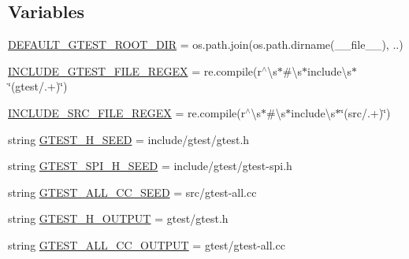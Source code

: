 \subsection*{Variables}
\begin{DoxyCompactItemize}
\item 
\mbox{\hyperlink{namespacefuse__gtest__files_a68085bdb2912baa7e71d2b3eb37b05c9}{D\+E\+F\+A\+U\+L\+T\+\_\+\+G\+T\+E\+S\+T\+\_\+\+R\+O\+O\+T\+\_\+\+D\+IR}} = os.\+path.\+join(os.\+path.\+dirname(\+\_\+\+\_\+file\+\_\+\+\_\+), \textquotesingle{}..\textquotesingle{})
\item 
\mbox{\hyperlink{namespacefuse__gtest__files_ad7abe9bfa06bb1c5411e8b4a7a686e5b}{I\+N\+C\+L\+U\+D\+E\+\_\+\+G\+T\+E\+S\+T\+\_\+\+F\+I\+L\+E\+\_\+\+R\+E\+G\+EX}} = re.\+compile(r\textquotesingle{}$^\wedge$\textbackslash{}s$\ast$\#\textbackslash{}s$\ast$include\textbackslash{}s$\ast$\char`\"{}(gtest/.+)\char`\"{}\textquotesingle{})
\item 
\mbox{\hyperlink{namespacefuse__gtest__files_aec4e054d0ab27276d6150468bb98a8a4}{I\+N\+C\+L\+U\+D\+E\+\_\+\+S\+R\+C\+\_\+\+F\+I\+L\+E\+\_\+\+R\+E\+G\+EX}} = re.\+compile(r\textquotesingle{}$^\wedge$\textbackslash{}s$\ast$\#\textbackslash{}s$\ast$include\textbackslash{}s$\ast$\char`\"{}(src/.+)\char`\"{}\textquotesingle{})
\item 
string \mbox{\hyperlink{namespacefuse__gtest__files_ad897bce28100f2b97216929013519181}{G\+T\+E\+S\+T\+\_\+\+H\+\_\+\+S\+E\+ED}} = \textquotesingle{}include/gtest/gtest.\+h\textquotesingle{}
\item 
string \mbox{\hyperlink{namespacefuse__gtest__files_a891d03ce9cfe3577cb4c193f9544f17f}{G\+T\+E\+S\+T\+\_\+\+S\+P\+I\+\_\+\+H\+\_\+\+S\+E\+ED}} = \textquotesingle{}include/gtest/gtest-\/spi.\+h\textquotesingle{}
\item 
string \mbox{\hyperlink{namespacefuse__gtest__files_a162a6031d0d5743a37a4f79227d5e916}{G\+T\+E\+S\+T\+\_\+\+A\+L\+L\+\_\+\+C\+C\+\_\+\+S\+E\+ED}} = \textquotesingle{}src/gtest-\/all.\+cc\textquotesingle{}
\item 
string \mbox{\hyperlink{namespacefuse__gtest__files_a16437f87d0f7a9800885a9082a0b773e}{G\+T\+E\+S\+T\+\_\+\+H\+\_\+\+O\+U\+T\+P\+UT}} = \textquotesingle{}gtest/gtest.\+h\textquotesingle{}
\item 
string \mbox{\hyperlink{namespacefuse__gtest__files_aa66c14474599109c46ec24eaa0ad4217}{G\+T\+E\+S\+T\+\_\+\+A\+L\+L\+\_\+\+C\+C\+\_\+\+O\+U\+T\+P\+UT}} = \textquotesingle{}gtest/gtest-\/all.\+cc\textquotesingle{}
\end{DoxyCompactItemize}


